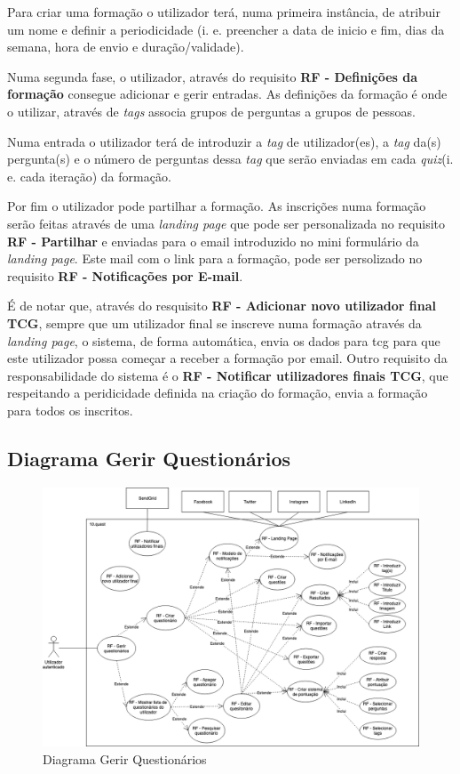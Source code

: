 Para criar uma formação o utilizador terá, numa primeira instância, de atribuir um nome e definir a periodicidade (i. e. preencher a data de inicio e fim, dias da semana, hora de envio e  duração/validade). 

Numa segunda fase, o utilizador, através do requisito \textbf{RF - Definições da formação} consegue adicionar e gerir entradas. As definições da formação é onde o utilizar, através de \textit{tags} associa grupos de perguntas a grupos de pessoas. 

Numa entrada o utilizador terá de introduzir a \textit{tag} de utilizador(es), a \textit{tag} da(s) pergunta(s) e o número de perguntas dessa \textit{tag} que serão enviadas em cada \textit{quiz}(i. e. cada iteração) da formação.

Por fim o utilizador pode partilhar a formação. As inscrições numa formação serão feitas através de uma \textit{landing page} que pode ser personalizada no requisito \textbf{RF - Partilhar} e enviadas para o email introduzido no mini formulário da \textit{landing page}. Este mail com o link para a formação, pode ser persolizado no requisito \textbf{RF - Notificações por E-mail}. 

É de notar que, através do resquisito \textbf{RF - Adicionar novo utilizador final TCG}, sempre que um utilizador final se inscreve numa formação através da \textit{landing page}, o sistema, de forma automática, envia os dados para \acrshort{tcg} para que este utilizador possa começar a receber a formação por email. Outro requisito da responsabilidade do sistema é o \textbf{RF - Notificar utilizadores finais TCG}, que respeitando a peridicidade definida na criação do formação, envia a formação para todos os inscritos.



\subsection{Diagrama Gerir Questionários}
\label{d:quests}
\begin{figure}[ht!]
	\begin{center}
		\includegraphics[width=1\textwidth]{img/rf/gerir-quest}
		\caption{Diagrama Gerir Questionários}
		\label{fig:rf-gerir-quest}
	\end{center}
\end{figure}

